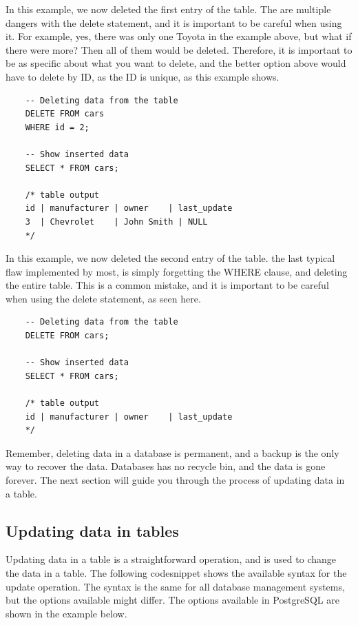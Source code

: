 In this example, we now deleted the first entry of the table. The are multiple dangers with the delete statement, and it is important to be careful when using it. For example, yes, there was only one Toyota in the example above, but what if there were more? Then all of them would be deleted. Therefore, it is important to be as specific about what you want to delete, and the better option above would have to delete by ID, as the ID is unique, as this example shows.

\begin{verbatim}
    -- Deleting data from the table
    DELETE FROM cars
    WHERE id = 2;

    -- Show inserted data
    SELECT * FROM cars;

    /* table output
    id | manufacturer | owner    | last_update
    3  | Chevrolet    | John Smith | NULL
    */
\end{verbatim}

In this example, we now deleted the second entry of the table. the last typical flaw implemented by most, is simply forgetting the WHERE clause, and deleting the entire table. This is a common mistake, and it is important to be careful when using the delete statement, as seen here.

\begin{verbatim}
    -- Deleting data from the table
    DELETE FROM cars;

    -- Show inserted data
    SELECT * FROM cars;

    /* table output
    id | manufacturer | owner    | last_update
    */
\end{verbatim}

Remember, deleting data in a database is permanent, and a backup is the only way to recover the data. Databases has no recycle bin, and the data is gone forever. The next section will guide you through the process of updating data in a table.

\subsection{Updating data in tables}
Updating data in a table is a straightforward operation, and is used to change the data in a table. The following codesnippet shows the available syntax for the update operation. The syntax is the same for all database management systems, but the options available might differ. The options available in PostgreSQL are shown in the example below.

